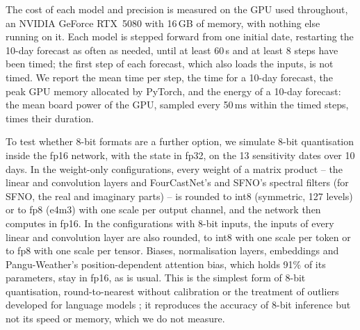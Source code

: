 The cost of each model and precision is measured on the GPU used
throughout, an NVIDIA GeForce RTX~5080 with 16\,GB of memory, with
nothing else running on it. Each model is stepped forward from one
initial date, restarting the 10-day forecast as often as needed, until at
least 60\,s and at least 8 steps have been timed; the first step of each
forecast, which also loads the inputs, is not timed. We report the mean
time per step, the time for a 10-day forecast, the peak GPU memory
allocated by PyTorch, and the energy of a 10-day forecast: the mean board
power of the GPU, sampled every 50\,ms within the timed steps, times
their duration.

To test whether 8-bit formats are a further option, we simulate
8-bit quantisation inside the fp16 network, with the state in fp32, on
the 13 sensitivity dates over 10 days. In the weight-only configurations,
every weight of a matrix product -- the linear and convolution layers and
FourCastNet's and SFNO's spectral filters (for SFNO, the real and
imaginary parts) -- is rounded to int8 (symmetric, 127 levels) or to fp8
(e4m3) with one scale per output channel, and the network then computes
in fp16. In the configurations with 8-bit inputs, the inputs of every
linear and convolution layer are also rounded, to int8 with one scale per
token or to fp8 with one scale per tensor. Biases, normalisation layers,
embeddings and Pangu-Weather's position-dependent attention bias, which
holds 91\% of its parameters, stay in fp16, as is usual. This is the
simplest form of 8-bit quantisation, round-to-nearest without
calibration or the treatment of outliers developed for language models
\citep{dettmers2022llmint8, xiao2022smoothquant, lin2023awq}; it
reproduces the accuracy of 8-bit inference but not its speed or memory,
which we do not measure.
